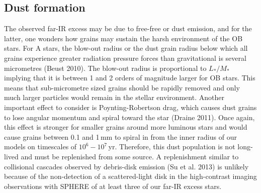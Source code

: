 \documentclass[tradiabstract]{aa} %
\begin{document}

\subsection{Dust formation}

The observed far-IR excess may be due to free-free or dust emission,
and for the latter, one wonders how grains may sustain the harsh
environment of the OB stars. For A stars, the blow-out radius or the
dust grain radius below which all grains experience greater radiation
pressure forces than gravitational is several micrometres (Beust
2010). The blow-out radius is proportional to $L_*/M_*$ implying that
it is between 1 and 2 orders of magnitude larger for OB stars. This
means that sub-micrometre sized grains should be rapidly removed and
only much larger particles would remain in the stellar environment.
Another important effect to consider is Poynting-Robertson drag, which
causes dust grains to lose angular momentum and spiral toward the star
(Draine 2011). Once again, this effect is stronger for smaller grains
around more luminous stars and would cause grains between 0.1 and
1\,mm to spiral in from the inner radius of our models on timescales
of $10^6 - 10^7$\,yr. Therefore, this dust population is not
long-lived and must be replenished from some source. A replenishment
similar to collisional cascades observed by debris-disk emission (Su
et al. 2013) is unlikely because of the { non-detection} of a
scattered-light disk in the high-contrast imaging observations with
SPHERE of at least three of our far-IR excess stars.
\end{document}
